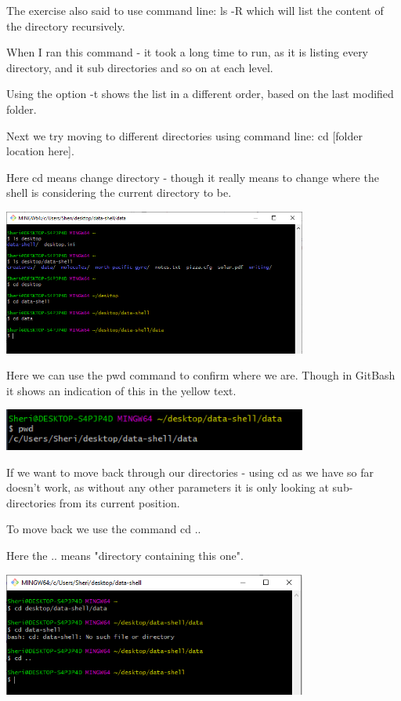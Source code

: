 \documentclass{article}
\begin{document}
The exercise also said to use command line: ls -R which will list the content of the directory recursively. 

When I ran this command - it took a long time to run, as it is listing every directory, and it sub directories and so on at each level. 

Using the option -t shows the list in a different order, based on the last modified folder. 

Next we try moving to different directories using command line: cd [folder location here].

Here cd means change directory - though it really means to change where the shell is considering the current directory to be.

\includegraphics[width=10cm]{Images/GitBash_007.PNG}

Here we can use the pwd command to confirm where we are. Though in GitBash it shows an indication of this in the yellow text.

\includegraphics[width=10cm]{Images/GitBash_008.PNG}

If we want to move back through our directories - using cd as we have so far doesn't work, as without any other parameters it is only looking at sub-directories from its current position. 

To move back we use the command cd ..

Here the .. means "directory containing this one".

\includegraphics[width=10cm]{Images/GitBash_009.PNG}
\end{document}
